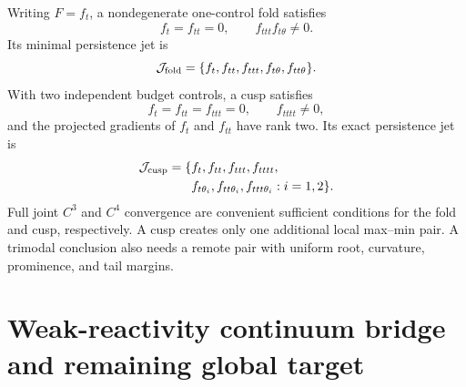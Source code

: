 \documentclass[aps,physrev,reprint,amsmath,amssymb,longbibliography,floatfix]{revtex4-2}
\begin{document}
Writing $F=f_t$, a nondegenerate one-control fold satisfies
\begin{equation}
 f_t=f_{tt}=0,\qquad
 f_{ttt}f_{t\theta}\ne0.
\label{eq:fold}
\end{equation}
Its minimal persistence jet is
\begin{equation}
 \mathcal J_{\rm fold}
 =\{f_t,f_{tt},f_{ttt},f_{t\theta},f_{tt\theta}\}.
\label{eq:foldjet}
\end{equation}
With two independent budget controls, a cusp satisfies
\begin{equation}
 f_t=f_{tt}=f_{ttt}=0,\qquad f_{tttt}\ne0,
\label{eq:cusp}
\end{equation}
and the projected gradients of $f_t$ and $f_{tt}$ have rank two.  Its exact
persistence jet is
\begin{equation}
\begin{split}
\mathcal J_{\rm cusp}=\{&
 f_t,f_{tt},f_{ttt},f_{tttt},\\
 &f_{t\theta_i},f_{tt\theta_i},f_{ttt\theta_i}:i=1,2\}.
\end{split}
\label{eq:cuspjet}
\end{equation}
Full joint $C^3$ and $C^4$ convergence are convenient sufficient conditions
for the fold and cusp, respectively.  A cusp creates only one additional
local max--min pair.  A trimodal conclusion also needs a remote pair with
uniform root, curvature, prominence, and tail margins.

\section{Weak-reactivity continuum bridge and remaining global target}
\label{sec:bridge}
\end{document}
